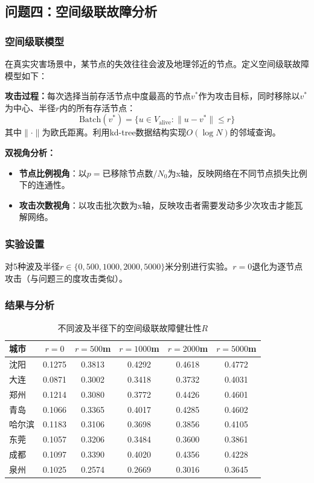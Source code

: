 \documentclass[12pt,a4paper]{article}
\begin{document}
\subsection{问题四：空间级联故障分析}

\subsubsection{空间级联模型}

在真实灾害场景中，某节点的失效往往会波及地理邻近的节点。定义空间级联故障模型如下：

\textbf{攻击过程：}每次选择当前存活节点中度最高的节点$v^*$作为攻击目标，同时移除以$v^*$为中心、半径$r$内的所有存活节点：
\begin{equation}
\text{Batch}(v^*) = \{u \in V_{\text{alive}} : \|u - v^*\| \leq r\}
\end{equation}
其中$\|\cdot\|$为欧氏距离。利用kd-tree数据结构实现$O(\log N)$的邻域查询。

\textbf{双视角分析：}
\begin{itemize}[leftmargin=2em]
    \item \textbf{节点比例视角}：以$p = \text{已移除节点数}/N_0$为x轴，反映网络在不同节点损失比例下的连通性。
    \item \textbf{攻击次数视角}：以攻击批次数为x轴，反映攻击者需要发动多少次攻击才能瓦解网络。
\end{itemize}

\subsubsection{实验设置}

对5种波及半径$r \in \{0, 500, 1000, 2000, 5000\}$米分别进行实验。$r=0$退化为逐节点攻击（与问题三的度攻击类似）。

\subsubsection{结果与分析}

\begin{table}[H]
\centering
\caption{不同波及半径下的空间级联故障健壮性$R$}
\begin{tabular}{lccccc}
\toprule
\textbf{城市} & $r=0$ & $r=500$m & $r=1000$m & $r=2000$m & $r=5000$m \\
\midrule
沈阳 & 0.1275 & 0.3813 & 0.4292 & 0.4618 & 0.4772 \\
大连 & 0.0871 & 0.3002 & 0.3418 & 0.3732 & 0.4031 \\
郑州 & 0.1214 & 0.3080 & 0.3772 & 0.4426 & 0.4601 \\
青岛 & 0.1066 & 0.3365 & 0.4017 & 0.4285 & 0.4602 \\
哈尔滨 & 0.1183 & 0.3106 & 0.3698 & 0.3856 & 0.4105 \\
东莞 & 0.1057 & 0.3206 & 0.3484 & 0.3600 & 0.3861 \\
成都 & 0.1097 & 0.3390 & 0.4020 & 0.4356 & 0.4228 \\
泉州 & 0.1025 & 0.2574 & 0.2669 & 0.3016 & 0.3645 \\
\bottomrule
\end{tabular}
\end{table}
\end{document}
